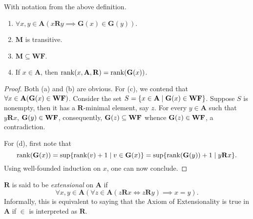 \begin{lemma}
    With notation from the above definition. 
    \begin{enumerate}[label=(\alph*)]
        \item $\forall x,y\in\mathbf A(x\mathbf R y\implies\mathbf G(x)\in\mathbf G(y))$. 
        \item $\mathbf M$ is transitive.
        \item $\mathbf M\subseteq\mathbf{WF}$.
        \item If $x\in\mathbf A$, then $\operatorname{rank}(x,\mathbf A,\mathbf R) = \operatorname{rank}(\mathbf G(x))$.
    \end{enumerate}
\end{lemma}
\begin{proof}
    Both (a) and (b) are obvious. For (c), we contend that $\forall x\in\mathbf A(\mathbf G(x)\in\mathbf{WF})$. Consider the set $S = \{x\in\mathbf A\mid\mathbf G(x)\in\mathbf{WF}\}$. Suppose $S$ is nonempty, then it has a $\mathbf R$-minimal element, say $z$. For every $y\in\mathbf A$ such that $y\mathbf R x$, $\mathbf G(y)\in\mathbf{WF}$, consequently, $\mathbf G(z)\subseteq\mathbf{WF}$ whence $\mathbf G(z)\in\mathbf{WF}$, a contradiction. 

    For (d), first note that 
    \begin{equation*}
        \operatorname{rank}(\mathbf G(x)) = \sup\{\operatorname{rank}(v) + 1\mid v\in\mathbf G(x)\} = \sup\{\operatorname{rank}(\mathbf G(y)) + 1\mid y\mathbf R x\}.
    \end{equation*}
    Using well-founded induction on $x$, one can now conclude. 
\end{proof}

\begin{definition}
    $\mathbf R$ is said to be \emph{extensional} on $\mathbf A$ if 
    \begin{equation*}
        \forall x,y\in\mathbf A\left(\forall z\in\mathbf A\left(z\mathbf R x\iff z\mathbf R y\right)\implies x = y\right).
    \end{equation*}
    Informally, this is equivalent to saying that the Axiom of Extensionality is true in $\mathbf A$ if $\in$ is interpreted as $\mathbf R$.
\end{definition}

